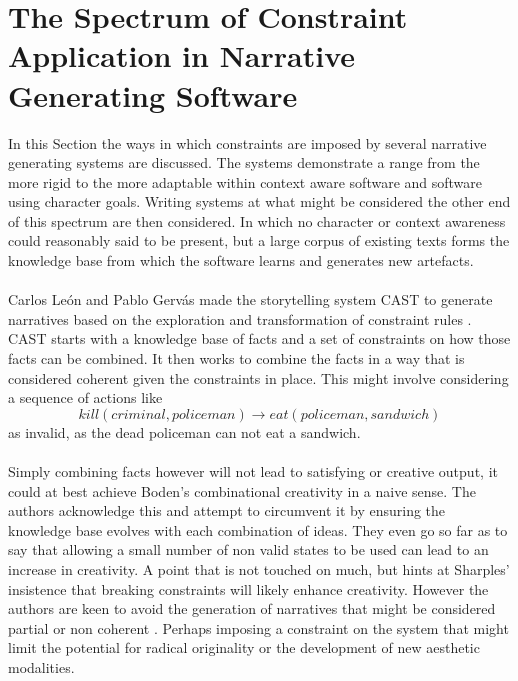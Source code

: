 \documentclass[letterpaper]{article}
\begin{document}
\section{The Spectrum of Constraint Application in Narrative Generating Software} \label{sec:spectrum}
In this Section the ways in which constraints are imposed by several narrative generating systems are discussed. The systems demonstrate a range from the more rigid to the more adaptable within context aware software and software using character goals. Writing systems at what might be considered the other end of this spectrum are then considered. In which no character or context awareness could reasonably said to be present, but a large corpus of existing texts forms the knowledge base from which the software learns and generates new artefacts.\\
\\Carlos Le\'on and Pablo Gerv\'as made the storytelling system CAST to generate narratives based on the exploration and transformation of constraint rules \cite{leon2008creative}. CAST starts with a knowledge base of facts and a set of constraints on how those facts can be combined. It then works to combine the facts in a way that is considered coherent given the constraints in place. This might involve considering a sequence of actions like\\
\begin{equation}
kill(criminal, policeman) \rightarrow eat(policeman, sandwich) 
\end{equation}
as invalid, as the dead policeman can not eat a sandwich. \\
\\Simply combining facts however will not lead to satisfying or creative output, it could at best achieve Boden's combinational creativity in a naive sense. The authors acknowledge this and attempt to circumvent it by ensuring the knowledge base evolves with each combination of ideas. They even go so far as to say that allowing a small number of non valid states to be used can lead to an increase in creativity. A point that is not touched on much, but hints at Sharples' insistence that breaking constraints will likely enhance creativity. However the authors are keen to avoid the generation of narratives that might be considered partial or non coherent \cite{leon2008creative}. Perhaps imposing a constraint on the system that might limit the potential for radical originality or the development of new aesthetic modalities.\\
\end{document}
